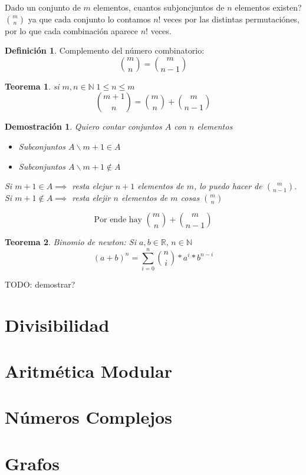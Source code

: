 \documentclass[9pt,a4paper,draft]{article}
\theoremstyle{definition}
\newtheorem{defi}{Definición}
\theoremstyle{plain}
\newtheorem{teo}{Teorema}
\newtheorem{demo}{Demostración}[teo]
\begin{document}
Dado un conjunto de $m$ elementos, cuantos subjoncjuntos de $n$ elementos existen? $\binom{m}{n}$ ya que cada conjunto lo contamos $n!$ veces por las distintas permutaciónes, por lo que cada combinación aparece $n!$ veces.

\begin{defi} Complemento del número combinatorio: $$\binom{m}{n}=\binom{m}{n-1}$$\end{defi}

\begin{teo} si $m,n\in{\mathbb{N}}\;1\leq{n}\leq{m}$ $$\binom{m+1}{n}=\binom{m}{n} + \binom{m}{n-1}$$ \end{teo}

\begin{demo}
Quiero contar conjuntos $A$ con $n$ elementos

\begin{itemize}
\item Subconjuntos $A\backslash m+1\in{A}$
\item Subconjuntos $A\backslash m+1\notin{A}$
\end{itemize}

Si $m+1\in{A}\implies$ resta elejur $n+1$ elementos de $m$, lo puedo hacer de $\binom{m}{n-1}$.\\

Si $m+1\notin{A}\implies$ resta elejir $n$ elementos de $m$ cosas $\binom{m}{n}$

$$\text{Por ende hay } \binom{m}{n} + \binom{m}{n-1}$$

\end{demo}

\begin{teo} Binomio de newton: Si $a,b\in{\mathbb{R}},\, n\in{\mathbb{N}}$
$$(a+b)^n = \displaystyle\sum_{i=0}^{n} \binom{n}{i}*a^i*b^{n-i}$$
\end{teo}

TODO: demostrar?

\part{Divisibilidad}

\part{Aritmética Modular}

\part{Números Complejos}

\part{Grafos}
\end{document}
